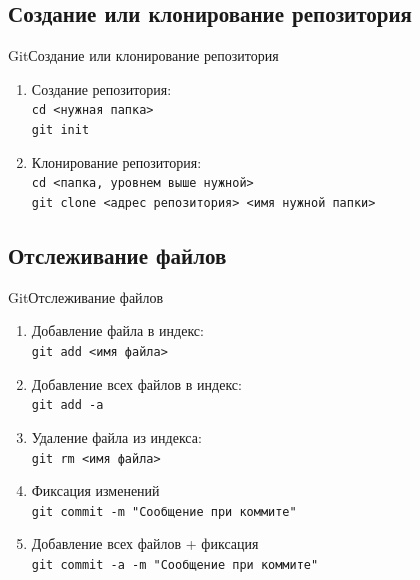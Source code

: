 \documentclass[10pt]{beamer}
\begin{document}
\subsection{Создание или клонирование репозитория}
\begin{frame}[fragile]{Git}{Создание или клонирование репозитория}
\begin{enumerate}
\item Создание репозитория:\\
\texttt{cd <нужная папка>}\\
\texttt{git init}\\

\item Клонирование репозитория: \\
\texttt{cd <папка, уровнем выше нужной>}\\
\texttt{git clone <адрес репозитория> <имя нужной папки>}\\
\end{enumerate}
\end{frame}

\subsection{Отслеживание файлов}
\begin{frame}[fragile]{Git}{Отслеживание файлов}
\begin{enumerate}
\item Добавление файла в индекс:\\
\texttt{git add <имя файла> }\\
\item Добавление всех файлов в индекс:\\
\texttt{git add -a }\\
\item Удаление файла из индекса:\\
\texttt{git rm <имя файла> }\\
\item Фиксация изменений\\
\texttt{git commit -m "Сообщение при коммите" }\\
\item Добавление всех файлов + фиксация\\
\texttt{git commit -a -m "Сообщение при коммите" }\\
\end{enumerate}
\end{frame}
\end{document}

